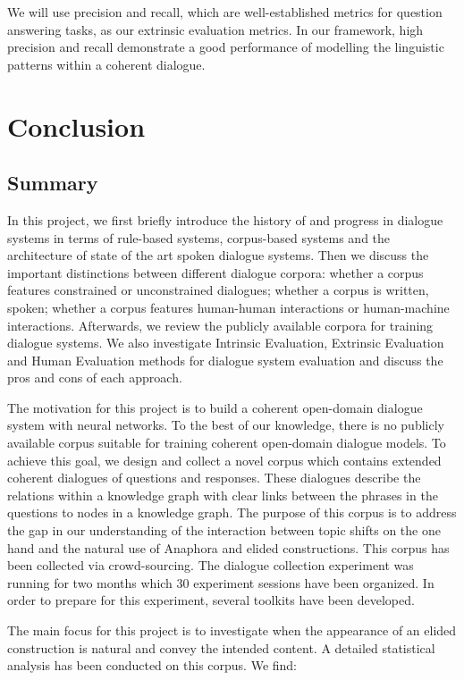 \documentclass[bsc,frontabs,twoside,singlespacing,parskip,deptreport]{infthesis}     %
\begin{document}
We will use precision and recall, which are well-established metrics for question answering tasks, as our extrinsic evaluation metrics. In our framework, high precision and recall demonstrate a good performance of modelling the linguistic patterns within a coherent dialogue.





\chapter{Conclusion}


\section{Summary}

In this project, we first briefly introduce the history of and progress in dialogue systems in terms of rule-based systems, corpus-based systems and the architecture of state of the art spoken dialogue systems. Then we discuss the important distinctions between different dialogue corpora: whether a corpus features constrained or unconstrained dialogues; whether a corpus is written, spoken; whether a corpus features human-human interactions or human-machine interactions. Afterwards, we review the publicly available corpora for training dialogue systems. We also investigate Intrinsic Evaluation, Extrinsic Evaluation and Human Evaluation methods for dialogue system evaluation and discuss the pros and cons of each approach.

The motivation for this project is to build a coherent open-domain dialogue system with neural networks. To the best of our knowledge, there is no publicly available corpus suitable for training coherent open-domain dialogue models. To achieve this goal, we design and collect a novel corpus which contains extended coherent dialogues of questions and responses. These dialogues describe the relations within a knowledge graph with clear links between the phrases in the questions to nodes in a knowledge graph. The purpose of this corpus is to address the gap in our understanding of the interaction between topic shifts on the one hand and the natural use of Anaphora and elided constructions. This corpus has been collected via crowd-sourcing. The dialogue collection experiment was running for two months which 30 experiment sessions have been organized. In order to prepare for this experiment, several toolkits have been developed.

The main focus for this project is to investigate when the appearance of an elided construction is natural and convey the intended content. A detailed statistical analysis has been conducted on this corpus. We find:
\end{document}
